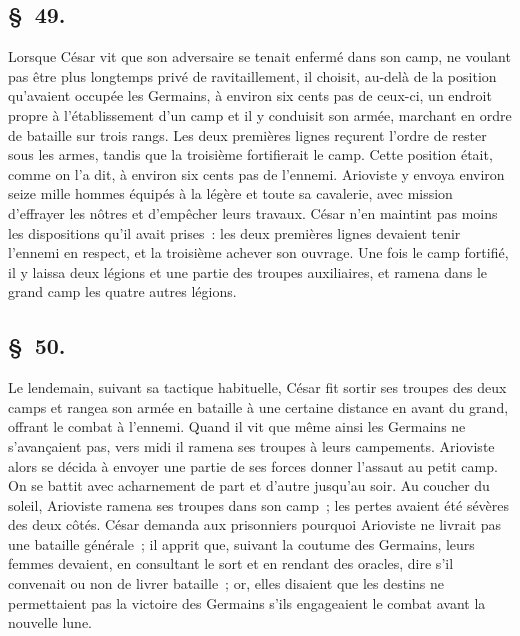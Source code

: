 \documentclass[french,twoside]{book} %
\begin{document}
\subsection[{§ 49.}]{ \textsc{§ 49.} }
\noindent Lorsque César vit que son adversaire se tenait enfermé dans son camp, ne voulant pas être plus longtemps privé de ravitaillement, il choisit, au-delà de la position qu’avaient occupée les Germains, à environ six cents pas de ceux-ci, un endroit propre à l’établissement d’un camp et il y conduisit son armée, marchant en ordre de bataille sur trois rangs. Les deux premières lignes reçurent l’ordre de rester sous les armes, tandis que la troisième fortifierait le camp. Cette position était, comme on l’a dit, à environ six cents pas de l’ennemi. Arioviste y envoya environ seize mille hommes équipés à la légère et toute sa cavalerie, avec mission d’effrayer les nôtres et d’empêcher leurs travaux. César n’en maintint pas moins les dispositions qu’il avait prises : les deux premières lignes devaient tenir l’ennemi en respect, et la troisième achever son ouvrage. Une fois le camp fortifié, il y laissa deux légions et une partie des troupes auxiliaires, et ramena dans le grand camp les quatre autres légions.
\subsection[{§ 50.}]{ \textsc{§ 50.} }
\noindent Le lendemain, suivant sa tactique habituelle, César fit sortir ses troupes des deux camps et rangea son armée en bataille à une certaine distance en avant du grand, offrant le combat à l’ennemi. Quand il vit que même ainsi les Germains ne s’avançaient pas, vers midi il ramena ses troupes à leurs campements. Arioviste alors se décida à envoyer une partie de ses forces donner l’assaut au petit camp. On se battit avec acharnement de part et d’autre jusqu’au soir. Au coucher du soleil, Arioviste ramena ses troupes dans son camp ; les pertes avaient été sévères des deux côtés. César demanda aux prisonniers pourquoi Arioviste ne livrait pas une bataille générale ; il apprit que, suivant la coutume des Germains, leurs femmes devaient, en consultant le sort et en rendant des oracles, dire s’il convenait ou non de livrer bataille ; or, elles disaient que les destins ne permettaient pas la victoire des Germains s’ils engageaient le combat avant la nouvelle lune.
\end{document}
